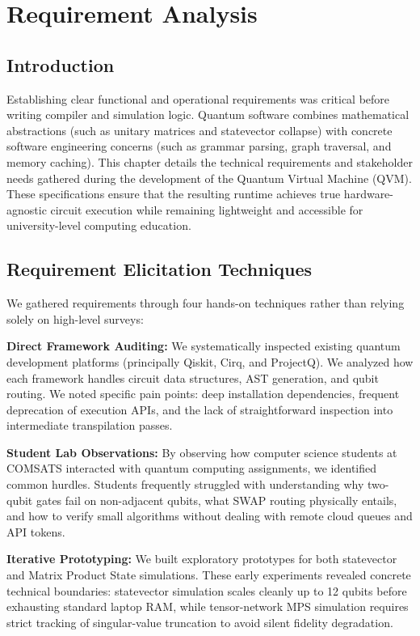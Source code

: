 \chapter{Requirement Analysis}

\section{Introduction}
Establishing clear functional and operational requirements was critical before writing compiler and simulation logic. Quantum software combines mathematical abstractions (such as unitary matrices and statevector collapse) with concrete software engineering concerns (such as grammar parsing, graph traversal, and memory caching). This chapter details the technical requirements and stakeholder needs gathered during the development of the Quantum Virtual Machine (QVM). These specifications ensure that the resulting runtime achieves true hardware-agnostic circuit execution while remaining lightweight and accessible for university-level computing education.

\section{Requirement Elicitation Techniques}
We gathered requirements through four hands-on techniques rather than relying solely on high-level surveys:

\textbf{Direct Framework Auditing:} We systematically inspected existing quantum development platforms (principally Qiskit, Cirq, and ProjectQ). We analyzed how each framework handles circuit data structures, AST generation, and qubit routing. We noted specific pain points: deep installation dependencies, frequent deprecation of execution APIs, and the lack of straightforward inspection into intermediate transpilation passes.

\textbf{Student Lab Observations:} By observing how computer science students at COMSATS interacted with quantum computing assignments, we identified common hurdles. Students frequently struggled with understanding why two-qubit gates fail on non-adjacent qubits, what SWAP routing physically entails, and how to verify small algorithms without dealing with remote cloud queues and API tokens.

\textbf{Iterative Prototyping:} We built exploratory prototypes for both statevector and Matrix Product State simulations. These early experiments revealed concrete technical boundaries: statevector simulation scales cleanly up to 12 qubits before exhausting standard laptop RAM, while tensor-network MPS simulation requires strict tracking of singular-value truncation to avoid silent fidelity degradation.

